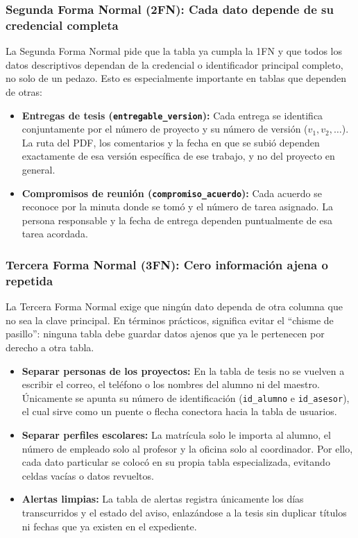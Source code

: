 \subsubsection{Segunda Forma Normal (2FN): Cada dato depende de su credencial completa}
La Segunda Forma Normal pide que la tabla ya cumpla la 1FN y que todos los datos descriptivos dependan de la credencial o identificador principal completo, no solo de un pedazo. Esto es especialmente importante en tablas que dependen de otras:

\begin{itemize}
    \item \textbf{Entregas de tesis (\texttt{entregable\_version}):} Cada entrega se identifica conjuntamente por el número de proyecto y su número de versión ($v_1, v_2, \dots$). La ruta del PDF, los comentarios y la fecha en que se subió dependen exactamente de esa versión específica de ese trabajo, y no del proyecto en general.
    \item \textbf{Compromisos de reunión (\texttt{compromiso\_acuerdo}):} Cada acuerdo se reconoce por la minuta donde se tomó y el número de tarea asignado. La persona responsable y la fecha de entrega dependen puntualmente de esa tarea acordada.
\end{itemize}

\subsubsection{Tercera Forma Normal (3FN): Cero información ajena o repetida}
La Tercera Forma Normal exige que ningún dato dependa de otra columna que no sea la clave principal. En términos prácticos, significa evitar el ``chisme de pasillo'': ninguna tabla debe guardar datos ajenos que ya le pertenecen por derecho a otra tabla.

\begin{itemize}
    \item \textbf{Separar personas de los proyectos:} En la tabla de tesis no se vuelven a escribir el correo, el teléfono o los nombres del alumno ni del maestro. Únicamente se apunta su número de identificación (\texttt{id\_alumno} e \texttt{id\_asesor}), el cual sirve como un puente o flecha conectora hacia la tabla de usuarios.
    \item \textbf{Separar perfiles escolares:} La matrícula solo le importa al alumno, el número de empleado solo al profesor y la oficina solo al coordinador. Por ello, cada dato particular se colocó en su propia tabla especializada, evitando celdas vacías o datos revueltos.
    \item \textbf{Alertas limpias:} La tabla de alertas registra únicamente los días transcurridos y el estado del aviso, enlazándose a la tesis sin duplicar títulos ni fechas que ya existen en el expediente.
\end{itemize}

